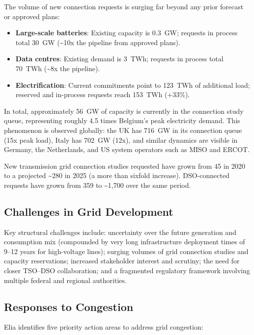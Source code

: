 The volume of new connection requests is surging far beyond any prior forecast or approved plans:

\begin{itemize}[noitemsep]
    \item \textbf{Large-scale batteries}: Existing capacity is 0.3~GW; requests in process total 30~GW (\textasciitilde10x the pipeline from approved plans).
    \item \textbf{Data centres}: Existing demand is 3~TWh; requests in process total 70~TWh (\textasciitilde8x the pipeline).
    \item \textbf{Electrification}: Current commitments point to 123~TWh of additional load; reserved and in-process requests reach 153~TWh (+33\%).
\end{itemize}

In total, approximately 56~GW of capacity is currently in the connection study queue, representing roughly 4.5 times Belgium's peak electricity demand. This phenomenon is observed globally: the UK has 716~GW in its connection queue (15x peak load), Italy has 702~GW (12x), and similar dynamics are visible in Germany, the Netherlands, and US system operators such as MISO and ERCOT.

New transmission grid connection studies requested have grown from 45 in 2020 to a projected \textasciitilde280 in 2025 (a more than sixfold increase). DSO-connected requests have grown from 359 to \textasciitilde1,700 over the same period.

\subsection{Challenges in Grid Development}

Key structural challenges include: uncertainty over the future generation and consumption mix (compounded by very long infrastructure deployment times of 9--12 years for high-voltage lines); surging volumes of grid connection studies and capacity reservations; increased stakeholder interest and scrutiny; the need for closer TSO--DSO collaboration; and a fragmented regulatory framework involving multiple federal and regional authorities.

\subsection{Responses to Congestion}

Elia identifies five priority action areas to address grid congestion:

